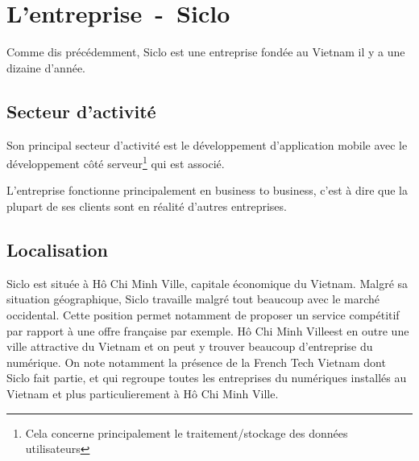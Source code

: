\documentclass[../rapport.tex]{subfiles}
\newcommand{\hcmc}{Hô Chi Minh Ville}
\begin{document}
    \chapter{L'entreprise~-~Siclo}
        Comme dis précédemment, Siclo est une entreprise fondée au Vietnam il y a une dizaine d'année.
        \section{Secteur d'activité}
        Son principal secteur d'activité est le développement d'application
        mobile avec le développement côté serveur\footnote{Cela concerne
        principalement le traitement/stockage des données utilisateurs} qui est
        associé.

        L'entreprise fonctionne principalement en business to business, c'est à
        dire que la plupart de ses clients sont en réalité d'autres
        entreprises.

        \section{Localisation}
        Siclo est située à \hcmc, capitale économique du Vietnam.
        Malgré sa situation géographique, Siclo travaille malgré tout beaucoup
        avec le marché occidental. Cette position permet notamment de proposer
        un service compétitif par rapport à une offre française par exemple.
        \hcmc est en outre une ville attractive du Vietnam et on peut
        y trouver beaucoup d'entreprise du numérique. On note notamment la présence
        de la \og French Tech Vietnam \fg dont Siclo fait partie, et qui regroupe toutes
        les entreprises du numériques installés au Vietnam et plus particulierement à \hcmc.
\end{document}
